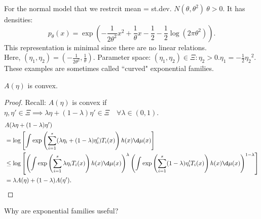 \documentclass[a4paper]{article}
\begin{document}
\begin{eg}
	For the normal model that we restrcit mean = st.dev. $N(\theta, {\theta}^2) \ \theta > 0$. It has densities:
	\begin{equation*}
		p_{\theta} (x) = \exp \left(-\frac{1}{2{\theta}^2} x^2 + \frac{1}{\theta} x - \frac{1}{2} - \frac{1}{2} \log(2 \pi {\theta}^2)\right).
	\end{equation*}
	This representation is minimal since there are no linear relations. \\ Here, $(\eta_1, \eta_2) = (-\frac{1}{2{\theta}^2}, \frac{1}{\theta})$. Parameter space: ${\left(\eta_1, \eta_2\right) \in \Xi: \eta_2 > 0. \eta_1 = - \frac{1}{2} {\eta_2}^2}$. \\ These examples are sometimes called ``curved" exponential families.
\end{eg}

\begin{prop}
	$A(\eta)$ is convex.
\end{prop}

\begin{proof}
	Recall: $A(\eta)$ is convex if $\eta, \eta' \in \Xi \implies \lambda \eta + (1-\lambda) \eta' \in \Xi \quad \forall \lambda \in (0,1)$.\\
	\begin{equation}
		\begin{aligned}
			&A(\lambda \eta + (1-\lambda) \eta') \\
			&= \log\left[\int \exp \left(\sum\limits_{i = 1}^s(\lambda \eta_i + (1-\lambda) \eta_i')T_i (x)\right)h(x) \d \mu (x)\right] \\
			&\leq \log\left[\left(\int \exp\left(\sum\limits_{i = 1}^s \lambda \eta_i T_i(x)\right) h(x) \d \mu (x)\right)^{\lambda} \left(\int \exp\left(\sum\limits_{i = 1}^s (1 - \lambda)\eta_i' T_i (x)\right) h(x) \d \mu (x)\right)^{1 - \lambda}\right] \\
			&= \lambda A(\eta) + (1-\lambda) A(\eta').
		\end{aligned}
	\end{equation}
\end{proof}

\begin{question}
	Why are exponential families useful?
\end{question}
\end{document}
